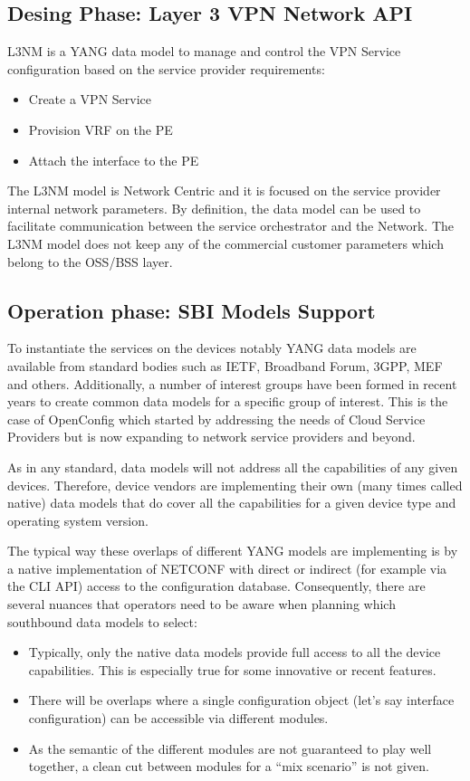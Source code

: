 \documentclass[conference]{IEEEtran}
\begin{document}
\subsection{Desing Phase: Layer 3 VPN Network API}

L3NM \cite{} is a YANG data model to manage and control the VPN Service configuration based on the service provider requirements:
\begin{itemize}
    \item Create a VPN Service
    \item Provision VRF on the PE
    \item  Attach the interface to the PE
\end{itemize}


The L3NM model is Network Centric and it is focused on the service provider internal network parameters. By definition, the data model can be used to facilitate communication between the service orchestrator and the Network. The L3NM model does not keep any of the commercial customer parameters which belong to the OSS/BSS layer.

\subsection{Operation phase: SBI Models Support}

To instantiate the services on the devices notably YANG data models are available from standard bodies such as IETF, Broadband Forum, 3GPP, MEF and others. Additionally, a number of interest groups have been formed in recent years to create common data models for a specific group of interest. This is the case of OpenConfig which started by addressing the needs of Cloud Service Providers but is now expanding to network service providers and beyond. 

As in any standard, data models will not address all the capabilities of any given devices. Therefore, device vendors are implementing their own (many times called native) data models that do cover all the capabilities for a given device type and operating system version.

The typical way these overlaps of different YANG models are implementing is by a native implementation of NETCONF with direct or indirect (for example via the CLI API) access to the configuration database. Consequently, there are several nuances that operators need to be aware when planning which southbound data models to select:
\begin{itemize}
    \item Typically, only the native data models provide full access to all the device capabilities. This is especially true for some innovative or recent features.
    \item There will be overlaps where a single configuration object (let’s say interface configuration) can be accessible via different modules. 
    \item As the semantic of the different modules are not guaranteed to play well together, a clean cut between modules for a “mix scenario” is not given.
\end{itemize}
\end{document}
